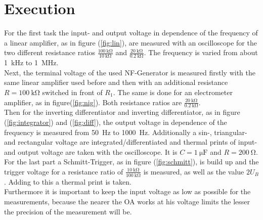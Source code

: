 \section{Execution}
For the first task the input- and output voltage in dependence of the frequency of a linear amplifier, as in figure (\ref{fig:lin}),
are measured with an oscilloscope for the two different resistance ratios $\frac{\SI{100}{\kilo\ohm}}{\SI{10}{\kilo\ohm}}$ and $\frac{\SI{20}{\kilo\ohm}}{\SI{0.2}{\kilo\ohm}}$.
The frequency is varied from about \SI{1}{\kilo\hertz} to \SI{1}{\mega\hertz}. \\
\newline
\noindent
Next, the terminal voltage of the used NF-Generator is measured firstly with the same linear amplifier used before and then with an additional resistance $R = \SI{100}{\kilo\ohm}$
switched in front of $R_1$. The same is done for an electrometer amplifier, as in figure(\ref{fig:nig}). Both resistance ratios are $\frac{\SI{20}{\kilo\ohm}}{\SI{0.2}{\kilo\ohm}}$. \\
\newline
\noindent
Then for the inverting differentiator and inverting differentiator, as in figure (\ref{fig:integrator}) and (\ref{fig:diff}), the output voltage in dependence of the frequency is measured from
\SI{50}{\hertz} to \SI{1000}{\hertz}. Additionally a sin-, triangular- and rectangular voltage are integrated/differentiated and thermal prints of input- and output voltage are taken with the oscilloscope.
It is $C = \SI{1}{\micro\farad}$ and $R = \SI{200}{\ohm}$. \\
\newline
\noindent
For the last part a Schmitt-Trigger, as in figure (\ref{fig:schmitt}), is build up and the trigger voltage for a resistance ratio of $\frac{\SI{10}{\kilo\ohm}}{\SI{100}{\kilo\ohm}}$ is measured, as well
as the value $2 U_B$. Adding to this a thermal print is taken. \\
\newline
\noindent
Furthermore it is important to keep the input voltage as low as possible for the measurements, because the nearer the OA
works at his voltage limits the lesser the precision of the measurement will be.
